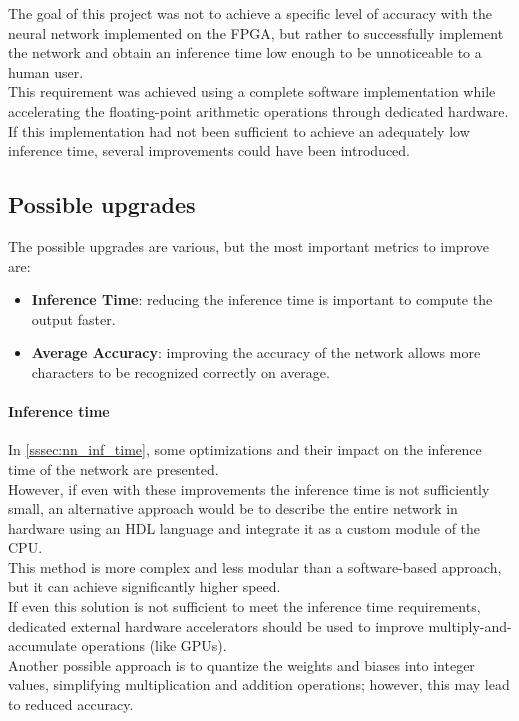 The goal of this project was not to achieve a specific level of accuracy with the neural network implemented on the FPGA, but rather to successfully implement the network and obtain an inference time low enough to be unnoticeable to a human user. \\
This requirement was achieved using a complete software implementation while accelerating the floating-point arithmetic operations through dedicated hardware. \\
If this implementation had not been sufficient to achieve an adequately low inference time, several improvements could have been introduced.

\subsection{Possible upgrades}

The possible upgrades are various, but the most important metrics to improve are:

\begin{itemize}
    \setlength\itemsep{0pt}
    \setlength\parskip{0pt}
    \item \textbf{Inference Time}: reducing the inference time is important to compute the output faster.
    \item \textbf{Average Accuracy}: improving the accuracy of the network allows more characters to be recognized correctly on average.
\end{itemize}

\paragraph{Inference time}

In \autoref{sssec:nn_inf_time}, some optimizations and their impact on the inference time of the network are presented. \\
However, if even with these improvements the inference time is not sufficiently small, an alternative approach would be to describe the entire network in hardware using an HDL language and integrate it as a custom module of the CPU. \\
This method is more complex and less modular than a software-based approach, but it can achieve significantly higher speed. \\
If even this solution is not sufficient to meet the inference time requirements, dedicated external hardware accelerators should be used to improve multiply-and-accumulate operations (like GPUs). \\
Another possible approach is to quantize the weights and biases into integer values, simplifying multiplication and addition operations; however, this may lead to reduced accuracy.


